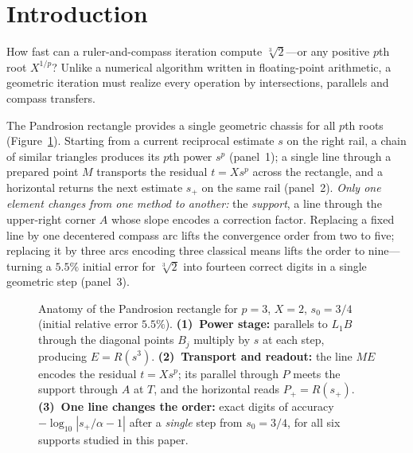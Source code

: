 \documentclass[10pt,a4paper]{article}
\theoremstyle{plain}
\theoremstyle{remark}
\numberwithin{equation}{section}
\begin{document}
\section{Introduction}

How fast can a ruler-and-compass iteration compute $\sqrt[3]{2}$---or any positive $p$th root $X^{1/p}$?
Unlike a numerical algorithm written in floating-point arithmetic, a geometric iteration must realize every
operation by intersections, parallels and compass transfers.

The Pandrosion rectangle provides a single geometric chassis for all $p$th roots (Figure~\ref{fig:anatomy}).
Starting from a current reciprocal estimate $s$ on the right rail, a chain of similar triangles produces
its $p$th power $s^{p}$ (panel~1); a single line through a prepared point $M$ transports the residual
$t=Xs^{p}$ across the rectangle, and a horizontal returns the next estimate $s_+$ on the same rail
(panel~2). \emph{Only one element changes from one method to another:} the \emph{support}, a line through
the upper-right corner $A$ whose slope encodes a correction factor. Replacing a fixed line by one
decentered compass arc lifts the convergence order from two to five; replacing it by three arcs encoding
three classical means lifts the order to nine---turning a $5.5\%$ initial error for $\sqrt[3]{2}$ into
fourteen correct digits in a single geometric step (panel~3).

\begin{figure}[htbp]
\centering\figAnatomy
\caption{Anatomy of the Pandrosion rectangle for $p=3$, $X=2$, $s_0=3/4$ (initial relative error $5.5\%$).
\textbf{(1)~Power stage:} parallels to $L_1B$ through the diagonal points $B_j$ multiply by $s$ at each step,
producing $E=R(s^{3})$.
\textbf{(2)~Transport and readout:} the line $ME$ encodes the residual $t=Xs^{p}$; its parallel through $P$
meets the support through $A$ at $T$, and the horizontal reads $P_+=R(s_+)$.
\textbf{(3)~One line changes the order:} exact digits of accuracy $-\log_{10}|s_+/\alpha-1|$ after a
\emph{single} step from $s_0=3/4$, for all six supports studied in this paper.}\label{fig:anatomy}
\end{figure}
\end{document}
